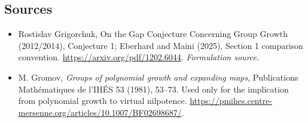 \documentclass[11pt]{article}
\begin{document}
\subsection{Sources}
\begin{itemize}
\item[S1]Rostislav Grigorchuk, On the Gap Conjecture Concerning Group Growth (2012/2014), Conjecture 1; Eberhard and Maini (2025), Section 1 comparison convention.
\url{https://arxiv.org/pdf/1202.6044}.
\textit{Formulation source.}
\item[E1]M. Gromov, \textit{Groups of polynomial growth and expanding maps}, Publications Math\'ematiques de l'IH\'ES 53 (1981), 53--73. Used only for the implication from polynomial growth to virtual nilpotence.
\url{https://pmihes.centre-mersenne.org/articles/10.1007/BF02698687/}.

\end{itemize}
\end{document}
